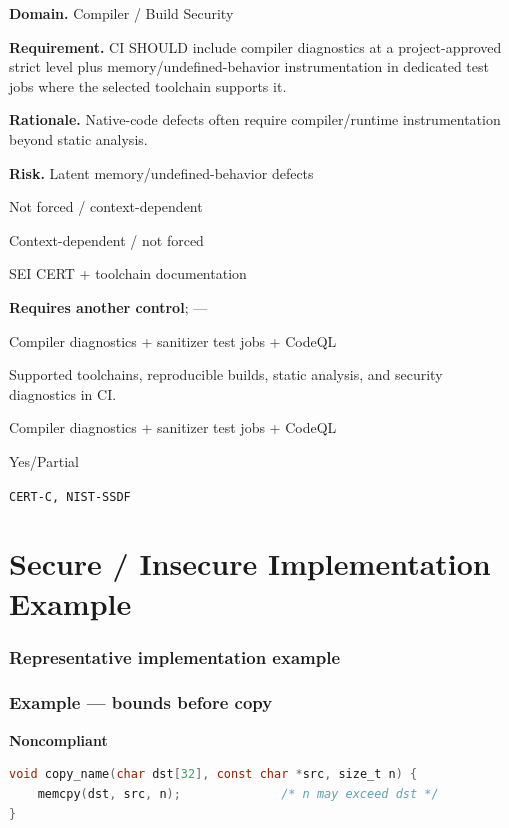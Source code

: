 \documentclass[10pt,letterpaper]{article}
\newcommand{\prioritybadge}[2]{\tcbox[on line,boxrule=0pt,arc=1.2mm,boxsep=0.7mm,left=1mm,right=1mm,top=0.4mm,bottom=0.4mm,colback=#2!12,coltext=#2]{\scriptsize\bfseries #1}}
\begin{document}
\begin{rulebox}[title={\texttt{SCS-C-BUILD-001} \hfill \prioritybadge{High Priority}{High}}]
\textbf{Domain.} Compiler / Build Security

\textbf{Requirement.} CI SHOULD include compiler diagnostics at a project-approved strict level plus memory/undefined-behavior instrumentation in dedicated test jobs where the selected toolchain supports it.

\textbf{Rationale.} Native-code defects often require compiler/runtime instrumentation beyond static analysis.

\textbf{Risk.} Latent memory/undefined-behavior defects

\begin{description}[leftmargin=2.65cm,labelwidth=2.3cm,style=nextline,itemsep=1pt,topsep=3pt]
  \item[CWE] Not forced / context-dependent
  \item[OWASP] Context-dependent / not forced
  \item[CERT] SEI CERT + toolchain documentation
  \item[CodeQL] \textbf{Requires another control}; ---
  \item[Enforcement] Compiler diagnostics + sanitizer test jobs + CodeQL
  \item[Prevention] Supported toolchains, reproducible builds, static analysis, and security diagnostics in CI.
  \item[Verification] Compiler diagnostics + sanitizer test jobs + CodeQL
  \item[Automation] Yes/Partial
  \item[Sources] \texttt{CERT-C, NIST-SSDF}
\end{description}
\end{rulebox}
\section{Secure / Insecure Implementation Example}
\subsubsection*{Representative implementation example}
\subsubsection*{Example --- bounds before copy}

\textbf{Noncompliant}\par
\begin{lstlisting}[language={C}]
void copy_name(char dst[32], const char *src, size_t n) {
    memcpy(dst, src, n);              /* n may exceed dst */
}
\end{lstlisting}
\end{document}
